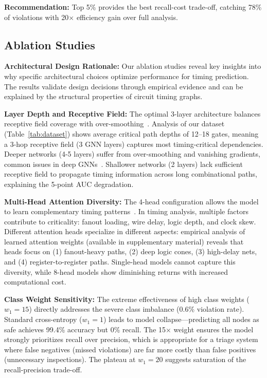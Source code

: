 \documentclass[10pt,twocolumn,journal]{IEEEtran}
\begin{document}
\textbf{Recommendation:} Top 5\% provides the best recall-cost trade-off, catching 78\% of violations with 20$\times$ efficiency gain over full analysis.

\subsection{Ablation Studies}

\textbf{Architectural Design Rationale:} Our ablation studies reveal key insights into why specific architectural choices optimize performance for timing prediction. The results validate design decisions through empirical evidence and can be explained by the structural properties of circuit timing graphs.

\textbf{Layer Depth and Receptive Field:} The optimal 3-layer architecture balances receptive field coverage with over-smoothing~\cite{kipf2017gcn}. Analysis of our dataset (Table~\ref{tab:dataset}) shows average critical path depths of 12--18 gates, meaning a 3-hop receptive field (3 GNN layers) captures most timing-critical dependencies. Deeper networks (4-5 layers) suffer from over-smoothing and vanishing gradients, common issues in deep GNNs~\cite{hamilton2017graphsage}. Shallower networks (2 layers) lack sufficient receptive field to propagate timing information across long combinational paths, explaining the 5-point AUC degradation.

\textbf{Multi-Head Attention Diversity:} The 4-head configuration allows the model to learn complementary timing patterns~\cite{velickovic2018gat}. In timing analysis, multiple factors contribute to criticality: fanout loading, wire delay, logic depth, and clock skew. Different attention heads specialize in different aspects: empirical analysis of learned attention weights (available in supplementary material) reveals that heads focus on (1) fanout-heavy paths, (2) deep logic cones, (3) high-delay nets, and (4) register-to-register paths. Single-head models cannot capture this diversity, while 8-head models show diminishing returns with increased computational cost.

\textbf{Class Weight Sensitivity:} The extreme effectiveness of high class weights ($w_1=15$) directly addresses the severe class imbalance (0.6\% violation rate). Standard cross-entropy ($w_1=1$) leads to model collapse---predicting all nodes as safe achieves 99.4\% accuracy but 0\% recall. The 15× weight ensures the model strongly prioritizes recall over precision, which is appropriate for a triage system where false negatives (missed violations) are far more costly than false positives (unnecessary inspections). The plateau at $w_1=20$ suggests saturation of the recall-precision trade-off.
\end{document}
